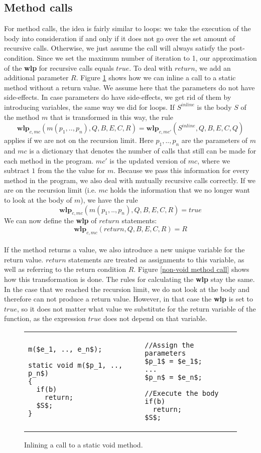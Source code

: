 \documentclass[a4paper, fleqn]{article}
\newcommand{\wlp}{\textbf{wlp}\xspace}
\begin{document}
\subsection{Method calls}
For method calls, the idea is fairly similar to loops: we take the execution of the body into consideration if and only if it does not go over the set amount of recursive calls. Otherwise, we just assume the call will always satisfy the post-condition. Since we set the maximum number of iteration to 1, our approximation of the \wlp for recursive calls equals $true$. To deal with $return$, we add an additional parameter $R$. Figure \ref{void method call} shows how we can inline a call to a static method without a return value. We assume here that the parameters do not have side-effects. In case parameters do have side-effects, we get rid of them by introducing variables, the same way we did for loops. If $S^{inline}$ is the body $S$ of the method $m$ that is transformed in this way, the rule \[\wlp_{c, mc}(m(p_1, .., p_n), Q, B, E, C, R) = \wlp_{c, mc'}(S^{inline}, Q, B, E, C, Q)\] applies if we are not on the recursion limit. Here $p_1, .., p_n$ are the parameters of $m$ and $mc$ is a dictionary that denotes the number of calls that still can be made for each method in the program. $mc'$ is the updated version of $mc$, where we subtract $1$ from the the value for $m$. Because we pass this information for every method in the program, we also deal with mutually recursive calls correctly. If we are on the recursion limit (i.e. $mc$ holds the information that we no longer want to look at the body of $m$), we have the rule \[\wlp_{c, mc}(m(p_1, .., p_n), Q, B, E, C, R) = true\] We can now define the \wlp of $return$ statements: \[\wlp_{c, mc}(return, Q, B, E, C, R) = R\]
\\
If the method returns a value, we also introduce a new unique variable for the return value. $return$ statements are treated as assignments to this variable, as well as referring to the return condition $R$. Figure \ref{non-void method call} shows how this transformation is done. The rules for calculating the \wlp stay the same. In the case that we reached the recursion limit, we do not look at the body and therefore can not produce a return value. However, in that case the \wlp is set to $true$, so it does not matter what value we substitute for the return variable of the function, as the expression $true$ does not depend on that variable.

\begin{figure}[H]
\begin{tabular}{ p{5.5cm} | p{5cm}}
\begin{lstlisting}
m($e_1, .., e_n$);

static void m($p_1, .., p_n$)
{
  if(b)
    return;
  $S$;
}
\end{lstlisting}
&
\begin{lstlisting}
//Assign the parameters
$p_1$ = $e_1$;
...
$p_n$ = $e_n$;

//Execute the body
if(b)
  return;
$S$;
\end{lstlisting}
\end{tabular}\caption{Inlining a call to a static void method.}
\label{void method call}
\end{figure}
 
\end{document}

